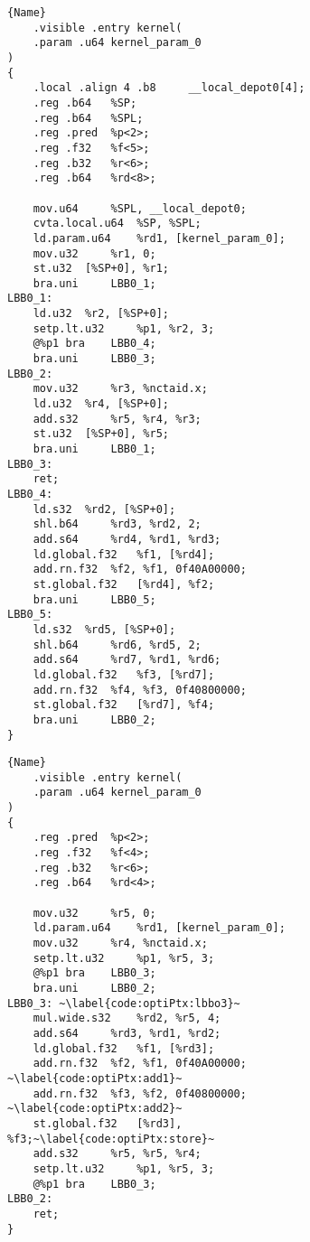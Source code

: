 \begin{figure}
  \hspace*{-.12\textwidth}%
  \begin{minipage}{0.6\textwidth}
    \centering
    \begin{lstlisting}[caption=Non-optimized generated PTX., label=code:unoptiPtx, frame=tlrb]{Name}
	.visible .entry kernel(
	.param .u64 kernel_param_0
)
{
	.local .align 4 .b8 	__local_depot0[4];
	.reg .b64 	%SP;
	.reg .b64 	%SPL;
	.reg .pred 	%p<2>;
	.reg .f32 	%f<5>;
	.reg .b32 	%r<6>;
	.reg .b64 	%rd<8>;

	mov.u64 	%SPL, __local_depot0;
	cvta.local.u64 	%SP, %SPL;
	ld.param.u64 	%rd1, [kernel_param_0];
	mov.u32 	%r1, 0;
	st.u32 	[%SP+0], %r1;
	bra.uni 	LBB0_1;
LBB0_1:
	ld.u32 	%r2, [%SP+0];
	setp.lt.u32 	%p1, %r2, 3;
	@%p1 bra 	LBB0_4;
	bra.uni 	LBB0_3;
LBB0_2:
	mov.u32 	%r3, %nctaid.x;
	ld.u32 	%r4, [%SP+0];
	add.s32 	%r5, %r4, %r3;
	st.u32 	[%SP+0], %r5;
	bra.uni 	LBB0_1;
LBB0_3:
	ret;
LBB0_4:
	ld.s32 	%rd2, [%SP+0];
	shl.b64 	%rd3, %rd2, 2;
	add.s64 	%rd4, %rd1, %rd3;
	ld.global.f32 	%f1, [%rd4];
	add.rn.f32 	%f2, %f1, 0f40A00000;
	st.global.f32 	[%rd4], %f2;
	bra.uni 	LBB0_5;
LBB0_5:
	ld.s32 	%rd5, [%SP+0];
	shl.b64 	%rd6, %rd5, 2;
	add.s64 	%rd7, %rd1, %rd6;
	ld.global.f32 	%f3, [%rd7];
	add.rn.f32 	%f4, %f3, 0f40800000;
	st.global.f32 	[%rd7], %f4;
	bra.uni 	LBB0_2;
}
	\end{lstlisting}
  \end{minipage}%
  \qquad
  \quad
  \begin{minipage}{0.6\textwidth}
    \centering
	\begin{lstlisting}[caption=Optimized generated PTX., label=code:optiPtx, frame=tlrb, firstnumber=1]{Name}
	.visible .entry kernel(
	.param .u64 kernel_param_0
)
{
	.reg .pred 	%p<2>;
	.reg .f32 	%f<4>;
	.reg .b32 	%r<6>;
	.reg .b64 	%rd<4>;

	mov.u32 	%r5, 0;
	ld.param.u64 	%rd1, [kernel_param_0];
	mov.u32 	%r4, %nctaid.x;
	setp.lt.u32 	%p1, %r5, 3;
	@%p1 bra 	LBB0_3;
	bra.uni 	LBB0_2;
LBB0_3: ~\label{code:optiPtx:lbbo3}~
	mul.wide.s32 	%rd2, %r5, 4;
	add.s64 	%rd3, %rd1, %rd2;
	ld.global.f32 	%f1, [%rd3];
	add.rn.f32 	%f2, %f1, 0f40A00000; ~\label{code:optiPtx:add1}~
	add.rn.f32 	%f3, %f2, 0f40800000; ~\label{code:optiPtx:add2}~
	st.global.f32 	[%rd3], %f3;~\label{code:optiPtx:store}~
	add.s32 	%r5, %r5, %r4;
	setp.lt.u32 	%p1, %r5, 3;
	@%p1 bra 	LBB0_3;
LBB0_2:
	ret;
}
	\end{lstlisting}
  \end{minipage}%
  \hspace*{-.1\textwidth}%
\end{figure}